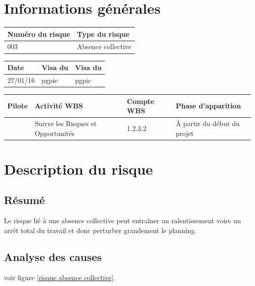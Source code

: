 
\section*{Informations générales}
 
\begin{table}[h]
\centering
	\begin{tabularx}{16.8cm}{|X|X|}
	\hline
	\rowcolor{gray!40} Numéro du risque & Type du risque \\
	\hline
	003 & Absence collective \\
	\hline
	\end{tabularx}
\end{table}

\begin{table}[h]
\centering
	\begin{tabularx}{16.8cm}{|X|X|X|}
	\hline
	\rowcolor{gray!40} Date & Visa du \RQ & Visa du \CP \\
	\hline
	 27/01/16 & pgpic & pgpic \\
	\hline
	\end{tabularx}
\end{table}

\begin{table}[h]
\centering
	\begin{tabularx}{16.8cm}{|X|X|X|X|}
	\hline
	\rowcolor{gray!40} Pilote & Activité WBS & Compte WBS & Phase d'apparition \\
	\hline
	 \Pierre & Suivre les Risques et Opportunités & 1.2.3.2 & À partir du début du projet \\
	\hline
	\end{tabularx}
\end{table}

\section*{Description du risque}

\subsection*{Résumé}
	Le risque lié à une absence collective peut entraîner un ralentissement voire un arrêt total du travail et donc perturber grandement le planning.
	
\subsection*{Analyse des causes}
	voir figure \ref{risque absence collective}.

